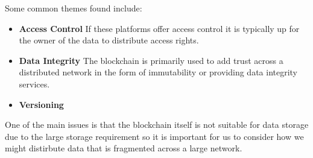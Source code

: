 \noindent
Some common themes found include:

\begin{itemize}
  \item \textbf{Access Control} If these platforms offer access control it is typically up for the owner of the data to distribute access rights. 
  \item \textbf{Data Integrity} The blockchain is primarily used to add trust across a distributed network in the form of immutability or providing data integrity services.
  \item \textbf{Versioning} 
\end{itemize}

\newparagraph
One of the main issues is that the blockchain itself is not suitable for data storage due to the large storage requirement so it is important for us to consider how we might distirbute data that is fragmented across a large network.
